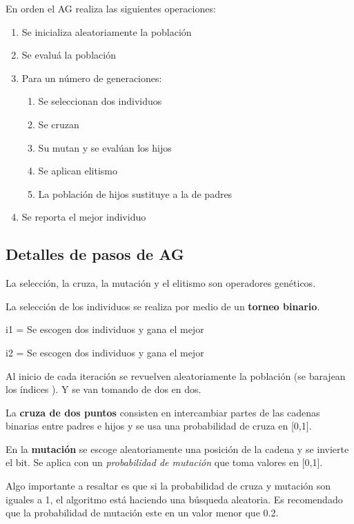 \documentclass[conference]{IEEEtran}
\begin{document}
En orden el AG realiza las siguientes operaciones:
\begin{enumerate}
\item Se inicializa aleatoriamente la población
\item Se evaluá la población
\item Para un número de generaciones:

	\begin{enumerate}
		\item Se seleccionan dos individuos
        \item Se cruzan
        \item Su mutan y se evalúan los hijos
        \item Se aplican elitismo
        \item La población de hijos sustituye a la de padres
	\end{enumerate}
	
	\item Se reporta el mejor individuo
\end{enumerate}

\subsection{Detalles de pasos de AG}

La selección, la cruza, la mutación y el elitismo son operadores genéticos. 

La selección de los individuos se realiza por medio de un \textbf{torneo binario}.

     i1 = Se escogen dos individuos y gana el mejor
     
     
     i2 = Se escogen dos individuos y gana el mejor 

   Al inicio de cada iteración se revuelven aleatoriamente
   la población (se barajean los índices ). Y se van tomando de
   dos en dos.

La \textbf{cruza de dos puntos} consisten en intercambiar partes de las cadenas binarias entre padres e hijos y se usa una probabilidad de cruza en [0,1].

En la \textbf{mutación} se escoge aleatoriamente una posición de la cadena y se invierte el bit. Se aplica con un \textit{probabilidad de mutación} que toma valores en [0,1].

Algo importante a resaltar es que si la probabilidad de cruza y mutación son iguales a 1, el algoritmo está haciendo una búsqueda aleatoria.  Es recomendado que la probabilidad de mutación este en un valor menor que 0.2.
\end{document}
